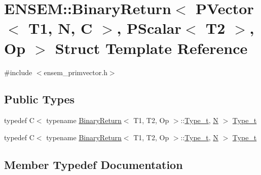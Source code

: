 \hypertarget{structENSEM_1_1BinaryReturn_3_01PVector_3_01T1_00_01N_00_01C_01_4_00_01PScalar_3_01T2_01_4_00_01Op_01_4}{}\section{E\+N\+S\+EM\+:\+:Binary\+Return$<$ P\+Vector$<$ T1, N, C $>$, P\+Scalar$<$ T2 $>$, Op $>$ Struct Template Reference}
\label{structENSEM_1_1BinaryReturn_3_01PVector_3_01T1_00_01N_00_01C_01_4_00_01PScalar_3_01T2_01_4_00_01Op_01_4}


{\ttfamily \#include $<$ensem\+\_\+primvector.\+h$>$}

\subsection*{Public Types}
\begin{DoxyCompactItemize}
\item 
typedef C$<$ typename \mbox{\hyperlink{structENSEM_1_1BinaryReturn}{Binary\+Return}}$<$ T1, T2, Op $>$\+::\mbox{\hyperlink{structENSEM_1_1BinaryReturn_3_01PVector_3_01T1_00_01N_00_01C_01_4_00_01PScalar_3_01T2_01_4_00_01Op_01_4_a0d5062c0e1f923bbacd25fb473e379b5}{Type\+\_\+t}}, \mbox{\hyperlink{operator__name__util_8cc_a7722c8ecbb62d99aee7ce68b1752f337}{N}} $>$ \mbox{\hyperlink{structENSEM_1_1BinaryReturn_3_01PVector_3_01T1_00_01N_00_01C_01_4_00_01PScalar_3_01T2_01_4_00_01Op_01_4_a0d5062c0e1f923bbacd25fb473e379b5}{Type\+\_\+t}}
\item 
typedef C$<$ typename \mbox{\hyperlink{structENSEM_1_1BinaryReturn}{Binary\+Return}}$<$ T1, T2, Op $>$\+::\mbox{\hyperlink{structENSEM_1_1BinaryReturn_3_01PVector_3_01T1_00_01N_00_01C_01_4_00_01PScalar_3_01T2_01_4_00_01Op_01_4_a0d5062c0e1f923bbacd25fb473e379b5}{Type\+\_\+t}}, \mbox{\hyperlink{operator__name__util_8cc_a7722c8ecbb62d99aee7ce68b1752f337}{N}} $>$ \mbox{\hyperlink{structENSEM_1_1BinaryReturn_3_01PVector_3_01T1_00_01N_00_01C_01_4_00_01PScalar_3_01T2_01_4_00_01Op_01_4_a0d5062c0e1f923bbacd25fb473e379b5}{Type\+\_\+t}}
\end{DoxyCompactItemize}


\subsection{Member Typedef Documentation}
\mbox{\label{structENSEM_1_1BinaryReturn_3_01PVector_3_01T1_00_01N_00_01C_01_4_00_01PScalar_3_01T2_01_4_00_01Op_01_4_a0d5062c0e1f923bbacd25fb473e379b5}} 
